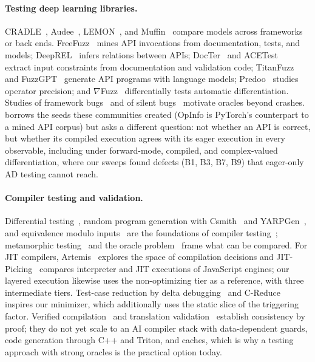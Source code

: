 \paragraph{Testing deep learning libraries.} CRADLE~\cite{DBLP:conf/icse/PhamLQT19}, Audee~\cite{DBLP:conf/kbse/GuoXLZLLS20}, LEMON~\cite{DBLP:conf/sigsoft/WangYCLZ20}, and
Muffin~\cite{DBLP:conf/icse/GuLZ022} compare models across frameworks or back ends. FreeFuzz~\cite{DBLP:conf/icse/WeiDYZ22} mines API
invocations from documentation, tests, and models; DeepREL~\cite{DBLP:conf/sigsoft/DengYWZ22} infers relations between APIs;
DocTer~\cite{DBLP:conf/issta/XieLKP0ZG22} and ACETest~\cite{DBLP:conf/issta/ShiXLLYYSCH23} extract input constraints from documentation and validation
code; TitanFuzz~\cite{DBLP:conf/issta/DengXPY023} and FuzzGPT~\cite{DBLP:conf/icse/DengXYZY024} generate API programs with language models;
Predoo~\cite{DBLP:conf/issta/ZhangSFLLCWC21} studies operator precision; and $\nabla$Fuzz~\cite{DBLP:conf/icse/YangDYTLZ23} differentially tests automatic
differentiation. Studies of framework bugs~\cite{DBLP:conf/sigsoft/IslamNPR19,DBLP:journals/tosem/ChenLSJL23,DBLP:conf/kbse/GuoCXMHLLZL19} and of silent
bugs~\cite{DBLP:journals/ese/TambonNAKA24} motivate oracles beyond crashes. \tool borrows the seeds these communities created
(OpInfo is PyTorch's counterpart to a mined API corpus) but asks a different question: not whether an API is
correct, but whether its compiled execution agrees with its eager execution in every observable, including under
forward-mode, compiled, and complex-valued differentiation, where our sweeps found defects (B1, B3, B7, B9) that
eager-only AD testing cannot reach.

\paragraph{Compiler testing and validation.} Differential testing~\cite{DBLP:journals/dtj/McKeeman98}, random program generation
with Csmith~\cite{DBLP:conf/pldi/YangCER11} and YARPGen~\cite{DBLP:journals/pacmpl/LivinskiiBR20}, and equivalence modulo inputs~\cite{DBLP:conf/pldi/LeAS14} are the foundations
of compiler testing~\cite{DBLP:journals/csur/ChenPPXZHZ20}; metamorphic testing~\cite{DBLP:journals/tse/SeguraFSC16,DBLP:journals/csur/ChenKLPTTZ18} and
the oracle problem~\cite{DBLP:journals/tse/BarrHMSY15} frame what can be compared. For JIT compilers, Artemis~\cite{DBLP:conf/sosp/Li00S23} explores
the space of compilation decisions and JIT-Picking~\cite{DBLP:conf/ccs/BernhardSSBH22} compares interpreter and JIT executions of
JavaScript engines; our layered execution likewise uses the non-optimizing tier as a reference, with three intermediate tiers. Test-case reduction by delta
debugging~\cite{DBLP:journals/tse/ZellerH02} and C-Reduce~\cite{DBLP:conf/pldi/RegehrCCEEY12} inspires our minimizer, which additionally uses the static
slice of the triggering factor. Verified compilation~\cite{DBLP:journals/cacm/Leroy09} and translation
validation~\cite{DBLP:conf/tacas/PnueliSS98,DBLP:conf/pldi/LopesLHLR21} establish consistency by proof; they do not yet scale to an AI compiler stack
with data-dependent guards, code generation through C++ and Triton, and caches, which is why a testing approach
with strong oracles is the practical option today.


